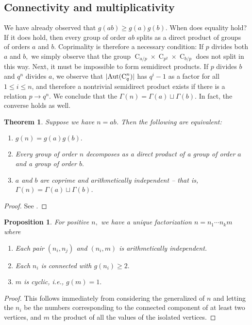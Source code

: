 \documentclass{article}
\DeclarePairedDelimiter\abs{\lvert}{\rvert}
\newcommand{\aut}[1]{\operatorname{Aut}(#1)}
\newcommand{\cyc}[1]{\operatorname{C}_{#1}}
\theoremstyle{plain}
\newtheorem{thm}{Theorem}[section]
\newtheorem{prop}{Proposition}[section]
\theoremstyle{definition}
\begin{document}
\subsection{Connectivity and multiplicativity}
We have already observed that $g(ab) \ge g(a)g(b).$ When does equality hold? If it does hold, then every group of order $ab$ splits as a direct product of groups of orders $a$ and $b.$ Coprimality is therefore a necessary condition: If $p$ divides both $a$ and $b,$ we simply observe that the group $\cyc{a/p} \times \cyc{p^2} \times \cyc{b/p}$ does not split in this way. Next, it must be impossible to form semidirect products. If $p$ divides $b$ and $q^n$ divides $a$, we observe that $\abs{\aut{\cyc{q}^n}}$ has $q^i - 1$ as a factor for all $1 \le i \le n$, and therefore a nontrivial semidirect product exists if there is a relation $p \rightarrow q^n.$ We conclude that the $\Gamma(n) = \Gamma(a) \sqcup \Gamma(b)$. In fact, the converse holds as well.

\begin{thm}
	Suppose we have $n = ab$. Then the following are equivalent:
	\begin{enumerate}\listspace
		\item $g(n) = g(a)g(b).$
		\item Every group of order $n$ decomposes as a direct product of a group of order $a$ and a group of order $b.$
		\item $a$ and $b$ are coprime and arithmetically independent -- that is, $\Gamma(n) = \Gamma(a) \sqcup \Gamma(b)$.
	\end{enumerate} \textspace
\end{thm}
\begin{proof}
	See {\cite[Lem.~21.19]{monolith}}.
\end{proof}

\begin{prop}
	For positive $n,$ we have a unique factorization $n = n_1 \cdots n_k m$ where\pagebreak[3]
	\begin{enumerate} \listspace
		\item Each pair $(n_i, n_j)$ and $(n_i, m)$ is arithmetically independent.
		\item Each $n_i$ is connected with $g(n_i) \ge 2.$
		\item $m$ is cyclic, i.e., $g(m) = 1.$
	\end{enumerate} \textspace
\end{prop}
\begin{proof}
	This follows immediately from considering the generalized  of $n$ and letting the $n_i$ be the numbers corresponding to the connected component of at least two vertices, and $m$ the product of all the values of the isolated vertices.
\end{proof}
\end{document}
